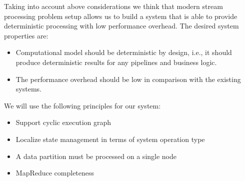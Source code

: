 Taking into account above considerations we think that 
modern stream processing problem setup allows us to build a system that is able to provide deterministic processing with low performance overhead. The desired system properties are:
\begin{itemize}
    \item Computational model should be deterministic by design, i.e., it should produce deterministic results for any pipelines and business logic.
    \item The performance overhead should be low in comparison with the existing systems.
\end{itemize}
We will use the following principles for our system:
\begin{itemize}
    \item Support cyclic execution graph
    \item Localize state management in terms of system operation type
    \item A data partition must be processed on a single node
    \item MapReduce completeness
\end{itemize}
